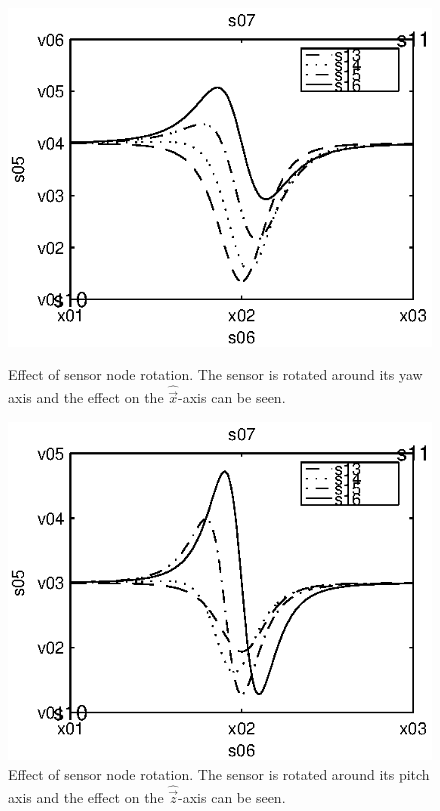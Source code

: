 \begin{subfigures}
\begin{figure}
 \centering
 \begin{minipage}{0.45\linewidth}
 \centering
  
  \includegraphics[width=1\linewidth]{images/xrotate}
 \caption[Effect of sensor node rotation. Yaw axis.]{Effect of sensor node rotation. The sensor is rotated around its yaw axis and the effect on the $\hat{\vec{x}}$-axis can be seen.}
 \label{fig:xrotate}
 \end{minipage}\hfill
 \begin{minipage}{0.45\linewidth}
 \centering
 
  \includegraphics[width=1\linewidth]{images/zrotate}
 \caption[Effect of sensor node rotation. Pitch axis.]{Effect of sensor node rotation. The sensor is rotated around its pitch axis and the effect on the $\hat{\vec{z}}$-axis can be seen.}
 \label{fig:zrotate}
 \end{minipage}
\end{figure}
\end{subfigures}

